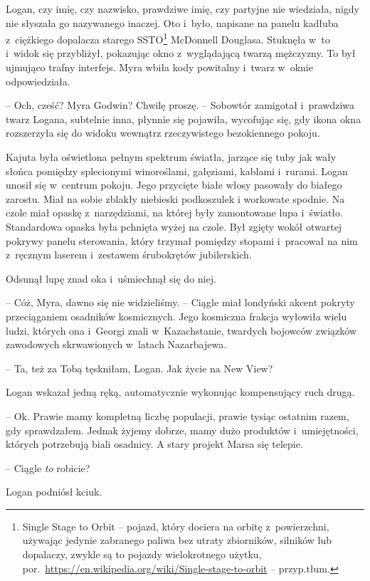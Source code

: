 \documentclass[oneside,polish,11pt,sfheadings]{mwbk}
\begin{document}
Logan, czy imię, czy nazwisko, prawdziwe imię, czy partyjne nie
wiedziała, nigdy nie słyszała go nazywanego inaczej. Oto i~było, napisane
na panelu kadłuba z~ciężkiego dopalacza starego SSTO\footnote{ Single Stage to
Orbit -- pojazd, który dociera na orbitę z~powierzchni, używając jedynie
zabranego paliwa bez utraty zbiorników, silników lub dopalaczy, zwykle
są to pojazdy wielokrotnego użytku,
por.~\url{https://en.wikipedia.org/wiki/Single-stage-to-orbit}
-- przyp.tłum.} McDonnell Douglasa. Stuknęła w~to i~widok się
przybliżył, pokazując okno z~wyglądającą twarzą mężczyzny. To był
ujmująco trafny interfejs. Myra wbiła kody powitalny i~twarz w~oknie
odpowiedziała.

-- Och, cześć? Myra Godwin? Chwilę proszę. -- Sobowtór zamigotał i~prawdziwa twarz Logana, subtelnie inna, płynnie się pojawiła, wycofując
się, gdy ikona okna rozszerzyła się do widoku wewnątrz rzeczywistego
bezokiennego pokoju.

Kajuta była oświetlona pełnym spektrum światła, jarzące się tuby jak
wały słońca pomiędzy splecionymi winoroślami, gałęziami, kablami i~rurami. Logan unosił się w~centrum pokoju. Jego przycięte białe włosy
pasowały do białego zarostu. Miał na sobie zblakły niebieski podkoszulek
i workowate spodnie. Na czole miał opaskę z~narzędziami, na której były
zamontowane lupa i~światło. Standardowa opaska była pchnięta wyżej na
czole. Był zgięty wokół otwartej pokrywy panelu sterowania, który
trzymał pomiędzy stopami i~pracował na nim z~ręcznym laserem i~zestawem
śrubokrętów jubilerskich.

Odsunął lupę znad oka i~uśmiechnął się do niej.

-- Cóż, Myra, dawno się nie widzieliśmy. -- Ciągle miał londyński akcent
pokryty przeciąganiem osadników kosmicznych. Jego kosmiczna frakcja
wyłowiła wielu ludzi, których ona i~Georgi znali w~Kazachstanie,
twardych bojowców związków zawodowych skrwawionych w~latach Nazarbajewa.

-- Ta, też za Tobą tęskniłam, Logan. Jak życie na New View?

Logan wskazał jedną ręką, automatycznie wykonując kompensujący ruch
drugą. 

-- Ok. Prawie mamy kompletną liczbę populacji, prawie tysiąc
ostatnim razem, gdy sprawdzałem. Jednak żyjemy dobrze, mamy dużo
produktów i~umiejętności, których potrzebują biali osadnicy. A stary
projekt Marsa się telepie.

-- Ciągle \textit{to} robicie?

Logan podniósł kciuk. 
\end{document}
